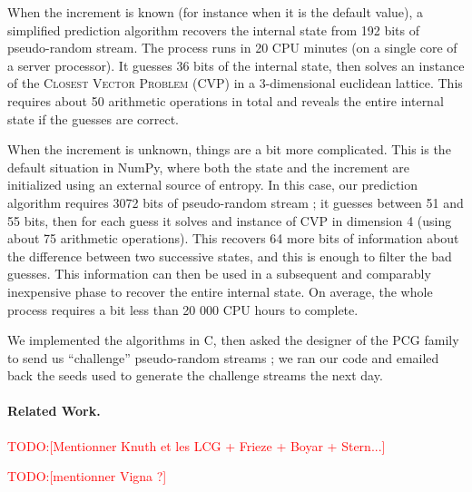 \documentclass[preprint,svgnames]{iacrtrans}
\newcommand{\todo}[1]{\textcolor{red}{TODO:[#1]}}
\begin{document}
When the increment is known (for instance when it is the default value), a
simplified prediction algorithm recovers the internal state from 192 bits of
pseudo-random stream. The process runs in 20 CPU minutes (on a single core of a
server processor). It guesses 36 bits of the internal state, then solves an
instance of the \textsc{Closest Vector Problem} (CVP) in a 3-dimensional
euclidean lattice. This requires about 50 arithmetic operations in total and
reveals the entire internal state if the guesses are correct.

When the increment is unknown, things are a bit more complicated. This is the
default situation in \textsf{NumPy}, where both the state and the increment are
initialized using an external source of entropy. In this case, our prediction
algorithm requires 3072 bits of pseudo-random stream ; it guesses between 51 and
55 bits, then for each guess it solves and instance of CVP in dimension 4 (using
about 75 arithmetic operations). This recovers 64 more bits of information about
the difference between two successive states, and this is enough to filter the
bad guesses. This information can then be used in a subsequent and comparably
inexpensive phase to recover the entire internal state. On average, the whole
process requires a bit less than 20 000 CPU hours to complete.

We implemented the algorithms in \textsf{C}, then asked the designer of the PCG
family to send us ``challenge'' pseudo-random streams ; we ran our code and
emailed back the seeds used to generate the challenge streams the next day.

\paragraph{Related Work.} \todo{Mentionner Knuth et les LCG + Frieze + Boyar + Stern...}

\todo{mentionner Vigna ?}


\end{document}
